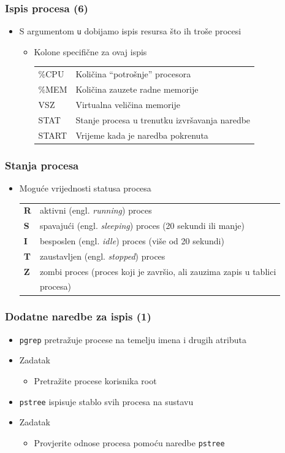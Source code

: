 \documentclass[table,usenames,dvipsnames]{beamer}
\newcommand{\shell}[1]{\texttt{#1}}
\begin{document}
\begin{frame}[t]
\frametitle{Ispis procesa (6)}
\begin{itemize}
  \item S argumentom \shell{u} dobijamo ispis resursa što ih troše procesi
  \begin{itemize}
    \item Kolone specifične za ovaj ispis
    \begin{tabular}{l l}
      \%CPU   & Količina ``potrošnje'' procesora  \\
      \%MEM   & Količina zauzete radne memorije \\ 
      VSZ     & Virtualna veličina memorije \\
      STAT    & Stanje procesa u trenutku izvršavanja naredbe \\
      START   & Vrijeme kada je naredba pokrenuta
    \end{tabular}
  \end{itemize}
\end{itemize}
\end{frame}

\begin{frame}[t]
\frametitle{Stanja procesa}
\begin{itemize}
  \item Moguće vrijednosti statusa procesa
    \begin{tabular}{l l}
      \textbf{R}  & aktivni (engl. \emph{running}) proces \\
      \textbf{S}  & spavajući (engl. \emph{sleeping}) proces (20 sekundi ili 
                    manje) \\
      \textbf{I}  & besposlen (engl. \emph{idle}) proces (više od 20 sekundi) \\
      \textbf{T}  & zaustavljen (engl. \emph{stopped}) proces \\
      \textbf{Z}  & zombi proces (proces koji je završio, ali zauzima zapis u 
                    tablici \\ & procesa)
    \end{tabular}
\end{itemize}
\end{frame}

\begin{frame}[t]
\frametitle{Dodatne naredbe za ispis (1)}
\begin{itemize}
  \item \shell{pgrep} pretražuje procese na temelju imena i drugih atributa
  \item Zadatak
  \begin{itemize}
    \item Pretražite procese korisnika root
  \end{itemize}
  \item \shell{pstree} ispisuje stablo svih procesa na sustavu
  \item Zadatak
  \begin{itemize}
    \item Provjerite odnose procesa pomoću naredbe \shell{pstree}
  \end{itemize}
\end{itemize}
\end{frame}
\end{document}
